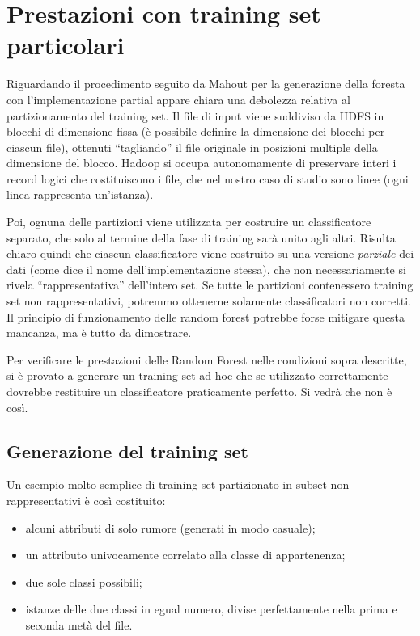 \documentclass[a4paper,11pt,twoside,openright,fleqn]{book}
\begin{document}
\chapter{Prestazioni con training set particolari}
\label{sec:casopatologico}

Riguardando il procedimento seguito da Mahout per la generazione della foresta con l'implementazione partial appare chiara una debolezza relativa al partizionamento del training set. Il file di input viene suddiviso da HDFS in blocchi di dimensione fissa (è possibile definire la dimensione dei blocchi per ciascun file), ottenuti ``tagliando'' il file originale in posizioni multiple della dimensione del blocco. Hadoop si occupa autonomamente di preservare interi i record logici che costituiscono i file, che nel nostro caso di studio sono linee (ogni linea rappresenta un'istanza).

Poi, ognuna delle partizioni viene utilizzata per costruire un classificatore separato, che solo al termine della fase di training sarà unito agli altri. Risulta chiaro quindi che ciascun classificatore viene costruito su una versione \emph{parziale} dei dati (come dice il nome dell'implementazione stessa), che non necessariamente si rivela ``rappresentativa'' dell'intero set. Se tutte le partizioni contenessero training set non rappresentativi, potremmo ottenerne solamente classificatori non corretti. Il principio di funzionamento delle random forest potrebbe forse mitigare questa mancanza, ma è tutto da dimostrare.

Per verificare le prestazioni delle Random Forest nelle condizioni sopra descritte, si è provato a generare un training set ad-hoc che se utilizzato correttamente dovrebbe restituire un classificatore praticamente perfetto. Si vedrà che non è così.

\section{Generazione del training set}

Un esempio molto semplice di training set partizionato in subset non rappresentativi è così costituito:
\begin{itemize}
\item alcuni attributi di solo rumore (generati in modo casuale);
\item un attributo univocamente correlato alla classe di appartenenza;
\item due sole classi possibili;
\item istanze delle due classi in egual numero, divise perfettamente nella prima e seconda metà del file.
\end{itemize}
\end{document}
